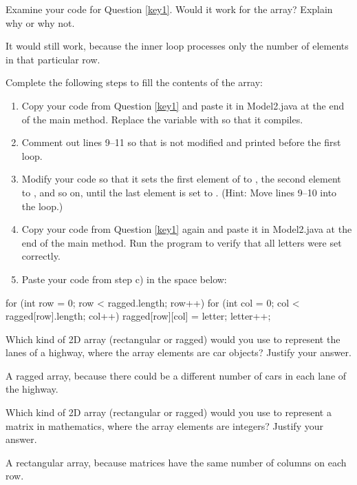 \Q Examine your code for Question \ref{key1}.
Would it work for the  array?
Explain why or why not.

\begin{answer}[3em]
It would still work, because the inner loop processes only the number of elements in that particular row.
\end{answer}


\Q \label{key2}
Complete the following steps to fill the contents of the  array:

\begin{enumerate}
\item Copy your code from Question \ref{key1} and paste it in Model2.java at the end of the main method.
Replace the variable  with  so that it compiles.

\item Comment out lines 9--11 so that  is not modified and printed before the first loop.

\item Modify your code so that it sets the first element of  to , the second element to , and so on, until the last element is set to .
(Hint: Move lines 9--10 into the loop.)

\item Copy your code from Question \ref{key1} again and paste it in Model2.java at the end of the main method. Run the program to verify that all letters were set correctly.

\item Paste your code from step c) in the space below:
\end{enumerate}

\begin{answer}[9em]
\begin{javaans}
for (int row = 0; row < ragged.length; row++) {
    for (int col = 0; col < ragged[row].length; col++) {
        ragged[row][col] = letter;
        letter++;
    }
}
\end{javaans}
\end{answer}


\Q Which kind of 2D array (rectangular or ragged) would you use to represent the lanes of a highway, where the array elements are car objects? Justify your answer.

\begin{answer}[3em]
A ragged array, because there could be a different number of cars in each lane of the highway.
\end{answer}


\Q Which kind of 2D array (rectangular or ragged) would you use to represent a matrix in mathematics, where the array elements are integers? Justify your answer.

\begin{answer}[3em]
A rectangular array, because matrices have the same number of columns on each row.
\end{answer}
